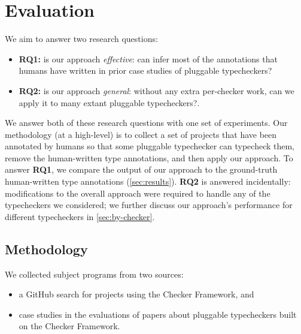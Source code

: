 \section{Evaluation}
\label{sec:evaluation}

We aim to answer two research questions:
\begin{itemize}
\item \textbf{RQ1:} is our approach \emph{effective}: can infer most of the
  annotations that humans have written in prior case studies of pluggable typecheckers?
\item \textbf{RQ2:} is our approach \emph{general}: without any extra per-checker work,
  can we apply it to many extant pluggable typecheckers?.
\end{itemize}



We answer both of these research questions with one set of
experiments.
%
Our methodology (at a high-level) is to collect a set of
projects that have been annotated by humans so that some pluggable
typechecker can typecheck them,
remove the human-written type annotations,
and then apply our approach.
%
To answer \textbf{RQ1}, we compare the output of our approach to the
ground-truth human-written type annotations (\cref{sec:results}).
%
\textbf{RQ2} is answered incidentally:  modifications to
the overall approach were required to handle any of the  typecheckers
we considered; we further discuss our approach's performance for different typecheckers
in \cref{sec:by-checker}.

\subsection{Methodology}
\label{sec:methodology}

We collected subject programs from two sources:
\begin{itemize}
\item a GitHub search for projects using the Checker Framework, and
\item case studies in the evaluations of papers about pluggable typecheckers built
  on the Checker Framework.
\end{itemize}


